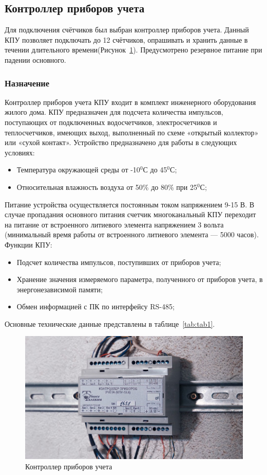 \subsection{Контроллер приборов учета}

Для подключения счётчиков был выбран контроллер приборов учета. Данный КПУ позволяет подключать до 12 счётчиков, опрашивать и хранить данные в течении длительного времени(Рисунок~\ref{fig:kpu}). Предусмотрено резервное питание при падении основного.

\subsubsection{Назначение}

Контроллер приборов учета КПУ входит в комплект инженерного оборудования жилого дома.
КПУ предназначен для подсчета количества импульсов, поступающих от подключенных водосчетчиков, электросчетчиков и теплосчетчиков, имеющих выход, выполненный по схеме «открытый коллектор» или «сухой контакт». 
Устройство предназначено для работы в следующих условиях:

\begin{itemize}
	\item Температура окружающей среды от -10$^{0}$С до 45$^{0}$С;
	\item Относительная влажность воздуха от 50\% до 80\% при 25$^{0}$С;
\end{itemize}

Питание устройства осуществляется постоянным током напряжением 9-15 В. В случае пропадания основного питания счетчик многоканальный КПУ переходит на питание от встроенного литиевого элемента напряжением 3 вольта (минимальный время работы от встроенного литиевого элемента --- 5000 часов).
Функции КПУ:

\begin{itemize}
	\item Подсчет количества импульсов, поступивших от приборов учета;
	\item Хранение значения измеряемого параметра, полученного от приборов учета, в энергонезависимой памяти;
	\item Обмен информацией с ПК по интерфейсу RS-485;
\end{itemize}
Основные технические данные представлены в таблице~\ref{tab:tab1}.
\begin{figure}
	\centering
	\includegraphics[width=0.7\linewidth]{pics/kpu}
	\caption{Контроллер приборов учета}
	\label{fig:kpu}
\end{figure}

